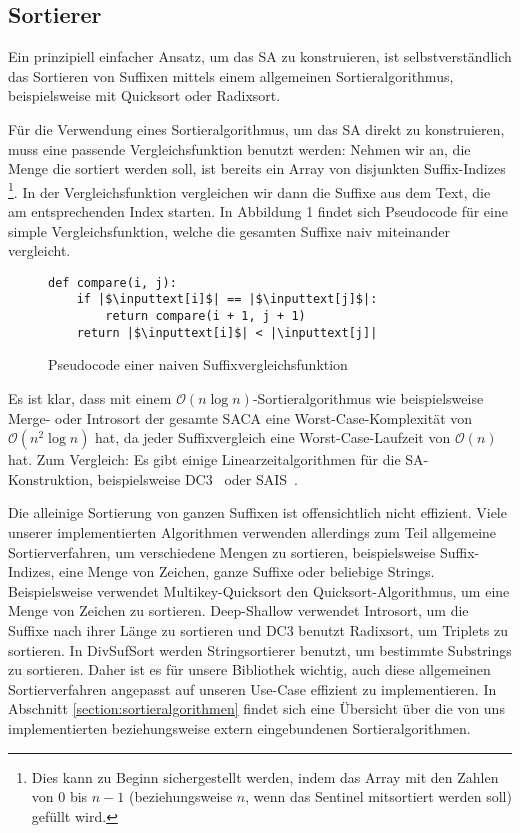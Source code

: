 \subsection{Sortierer}
Ein  prinzipiell einfacher Ansatz, um das SA zu konstruieren,
ist selbstverständlich das Sortieren von Suffixen mittels einem allgemeinen Sortieralgorithmus,
beispielsweise mit Quicksort oder Radixsort.

Für die Verwendung eines Sortieralgorithmus, um das SA direkt zu konstruieren,
muss eine passende Vergleichsfunktion benutzt werden:
Nehmen wir an, die Menge die sortiert werden soll, ist bereits ein Array von disjunkten Suffix-Indizes
\footnote{Dies kann zu Beginn sichergestellt werden, indem das
Array mit den Zahlen von 0 bis $n-1$ (beziehungsweise $n$, wenn das Sentinel mitsortiert werden soll) gefüllt wird.}.
In der Vergleichsfunktion vergleichen wir dann die Suffixe aus dem Text, die am entsprechenden Index starten.
In Abbildung 1 findet sich Pseudocode für eine simple Vergleichsfunktion,
welche die gesamten Suffixe naiv miteinander vergleicht.

\begin{figure}[!h]
\begin{verbatim}
def compare(i, j):
    if |$\inputtext[i]$| == |$\inputtext[j]$|:
        return compare(i + 1, j + 1)
    return |$\inputtext[i]$| < |\inputtext[j]|
\end{verbatim}
\caption{Pseudocode einer naiven Suffixvergleichsfunktion}
\end{figure}
%
Es ist klar, dass mit einem $\mathcal O(n \log n)$-Sortieralgorithmus wie beispielsweise Merge- oder Introsort
der gesamte SACA eine Worst-Case-Komplexität von\\ $\mathcal O(n^2 \log n)$ hat, da jeder Suffixvergleich
eine Worst-Case-Laufzeit von $\mathcal O(n)$ hat.
Zum Vergleich: Es gibt einige Linearzeitalgorithmen für die SA-Konstruktion, beispielsweise DC3~\cite{saca:9} oder SAIS~\cite{saca:6}.

Die alleinige Sortierung von ganzen Suffixen ist offensichtlich nicht effizient.
Viele unserer implementierten Algorithmen verwenden allerdings zum Teil allgemeine Sortierverfahren,
um verschiedene Mengen zu sortieren,
beispielsweise Suffix-Indizes, eine Menge von Zeichen, ganze Suffixe oder beliebige Strings.
Beispielsweise verwendet Multikey-Quicksort den Quicksort-Algorithmus, um eine Menge von Zeichen zu sortieren.
Deep-Shallow verwendet Introsort, um die Suffixe nach ihrer Länge zu sortieren
und DC3 benutzt Radixsort, um Triplets zu sortieren.
In DivSufSort werden Stringsortierer benutzt, um bestimmte Substrings zu sortieren.
Daher ist es für unsere Bibliothek wichtig, auch diese allgemeinen Sortierverfahren angepasst
auf unseren Use-Case effizient zu implementieren.
In Abschnitt \ref{section:sortieralgorithmen} findet sich eine Übersicht über die von uns
implementierten beziehungsweise extern eingebundenen Sortieralgorithmen.
